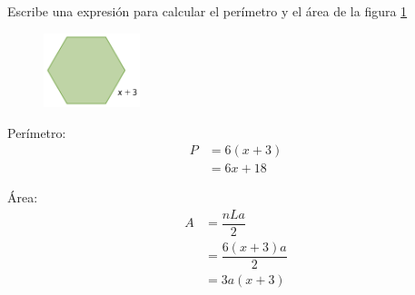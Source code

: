 Escribe una expresión para calcular el perímetro y el área de la figura \ref{fig:20230319032932}

\begin{figure}[H]
    \centering
    \includegraphics[width=0.25\textwidth]{../images/20230319032932}
    \caption{}
    \label{fig:20230319032932}
\end{figure}

\begin{solutionbox}{4cm}
    \begin{multicols}{2}
      Perímetro:
      \begin{align*}
        P & =6(x+3)\\
            & =6x+18
      \end{align*}

      Área:
      \begin{align*}
        A & =\dfrac{nLa}{2}\\
        & =\dfrac{6(x+3)a}{2}\\
        & =3a(x+3)
      \end{align*}

    \end{multicols}
  \end{solutionbox}